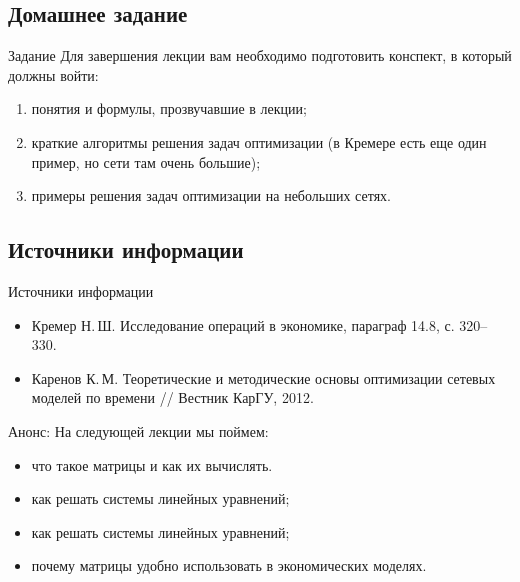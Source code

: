 \documentclass[unicode,11pt,notheorems]{beamer}
\begin{document}
\subsection{Домашнее задание}
\begin{frame}{Задание}
Для завершения лекции вам необходимо подготовить конспект, в который должны войти:
	\begin{enumerate}
		\item 
			понятия и формулы, прозвучавшие в лекции;
		\item 
			краткие алгоритмы решения задач оптимизации (в Кремере есть еще один пример, но сети там очень большие);
		\item 
			примеры решения задач оптимизации на небольших сетях.
	\end{enumerate}


\end{frame}

\subsection{Источники информации}
\begin{frame}{Источники информации}
\begin{itemize}
\item 
	Кремер  Н.\,Ш. Исследование операций в экономике, параграф 14.8, с. 320--330.

\item 
	Каренов  К.\,М. Теоретические и методические основы оптимизации сетевых моделей по времени // Вестник КарГУ, 2012.
	
\end{itemize}

\end{frame}

\begin{frame}{Анонс:}
	На следующей лекции мы поймем:
	\begin{itemize}
	\item 
		что такое матрицы и как их вычислять.
	\item 
		как решать системы линейных уравнений;
	\item 
		как решать системы линейных уравнений;
	\item 
		почему матрицы удобно использовать в экономических моделях.

	\end{itemize}

\end{frame}
\end{document}

